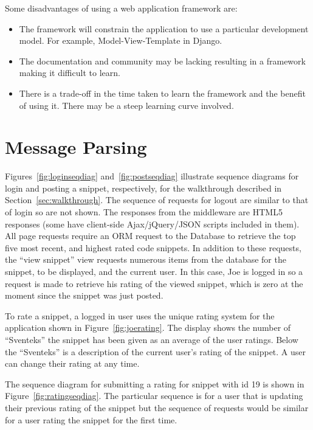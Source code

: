 \documentclass{sig-alt-release2}
\begin{document}
Some disadvantages of using a web application framework are:

\begin{itemize}
\item The framework will constrain the application to use a particular
development model. For example, Model-View-Template in Django.
\item The documentation and community may be lacking resulting in a
framework making it difficult to learn.
\item There is a trade-off in the time taken to learn the framework
and the benefit of using it. There may be a steep learning curve
involved.
\end{itemize}

\section{Message Parsing}

Figures~\ref{fig:loginseqdiag} and~\ref{fig:postseqdiag} illustrate
sequence diagrams for login and posting a snippet, respectively,
for the walkthrough described in Section~\ref{sec:walkthrough}.
The sequence of requests for logout are similar to that of login so are
not shown. The responses from the middleware are HTML5 responses
(some have client-side Ajax/jQuery/JSON scripts included in them).
All page requests require an ORM request to
the Database to retrieve the top five most recent, and highest rated
code snippets. In addition to these requests, the
``view snippet'' view requests numerous items from the database for
the snippet, to be displayed, and the current user. In this
case, Joe is logged in so a request is made to retrieve his
rating of the viewed snippet, which is zero at the moment since the
snippet was just posted.

To rate a snippet, a logged in user uses the unique rating system for
the application shown in Figure~\ref{fig:joerating}. The display shows
the number of ``Sventeks'' the snippet has been given as an average of
the user ratings. Below the ``Sventeks'' is a description of the current
user's rating of the snippet. A user can change their rating at any time.

The sequence diagram for submitting a rating for snippet with id 19 is
shown in Figure~\ref{fig:ratingseqdiag}. The particular sequence is for
a user that is updating their previous rating of the snippet but the
sequence of requests would be similar for a user rating the snippet
for the first time.
\end{document}
